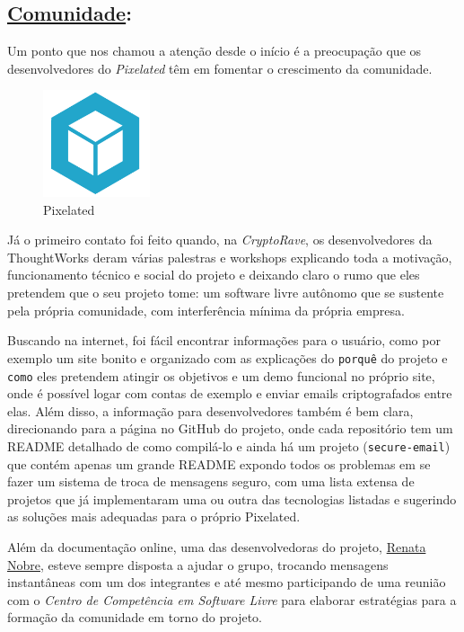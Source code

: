 \subsection*{\underline{Comunidade}:}

Um ponto que nos chamou a atenção desde o início é a preocupação que os
desenvolvedores do \emph{Pixelated} têm em fomentar o crescimento da comunidade.

\begin{figure} %
\begin{center}
\includegraphics[width=0.28\textwidth]{src/pixelated-logo.png}
\caption*{Pixelated}
\end{center}
\end{figure}

Já o primeiro contato foi feito quando, na \emph{CryptoRave}, os desenvolvedores
da
ThoughtWorks deram várias palestras e workshops explicando toda a motivação,
funcionamento técnico e social do projeto e deixando claro o rumo que eles
pretendem que o seu projeto tome: um software livre autônomo que se sustente
pela
própria comunidade, com interferência mínima da própria empresa.

Buscando na internet, foi fácil encontrar informações para o usuário, como por
exemplo
um site bonito e organizado com as explicações do \texttt{porquê} do projeto e
\texttt{como} eles pretendem atingir os objetivos e um demo funcional no próprio
site, onde é possível logar com contas de exemplo e enviar emails
criptografados entre elas.
Além disso, a informação para desenvolvedores também é bem clara, direcionando
para a página no GitHub do projeto, onde cada repositório tem um README detalhado
de como compilá-lo e ainda há um projeto (\texttt{secure-email}) que contém apenas um
grande README expondo todos os problemas em se fazer um sistema de troca de
mensagens seguro, com uma lista extensa de projetos que já implementaram uma ou
outra das tecnologias listadas e sugerindo as soluções mais adequadas para o
próprio Pixelated.

Além da documentação online, uma das desenvolvedoras do projeto,
\href{https://github.com/re-nobre}{Renata Nobre},
esteve sempre disposta a ajudar o grupo, trocando mensagens instantâneas com um
dos integrantes e até mesmo participando de uma reunião com o
\emph{Centro de Competência em Software Livre} para elaborar
estratégias para a formação da comunidade em torno do projeto.

